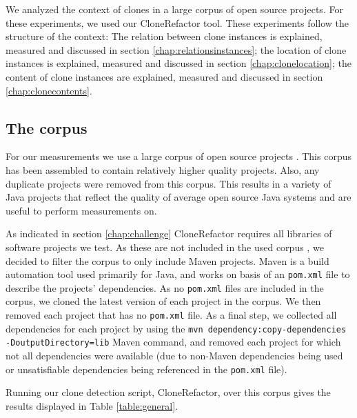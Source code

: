 \documentclass[a4paper]{article}
\begin{document}
We analyzed the context of clones in a large corpus of open source projects. For these experiments, we used our CloneRefactor tool. These experiments follow the structure of the context: The relation between clone instances is explained, measured and discussed in section \ref{chap:relationsinstances}; the location of clone instances is explained, measured and discussed in section \ref{chap:clonelocation};  the content of clone instances are explained, measured and discussed in section \ref{chap:clonecontents}.

\subsection{The corpus}\label{chap:corpus}
For our measurements we use a large corpus of open source projects \cite{githubCorpus2013}. This corpus has been assembled to contain relatively higher quality projects. Also, any duplicate projects were removed from this corpus. This results in a variety of Java projects that reflect the quality of average open source Java systems and are useful to perform measurements on.

As indicated in section \ref{chap:challenge} CloneRefactor requires all libraries of software projects we test. As these are not included in the used corpus \cite{githubCorpus2013}, we decided to filter the corpus to only include Maven projects. Maven is a build automation tool used primarily for Java, and works on basis of an \texttt{pom.xml} file to describe the projects' dependencies. As no \texttt{pom.xml} files are included in the corpus, we cloned the latest version of each project in the corpus. We then removed each project that has no \texttt{pom.xml} file. As a final step, we collected all dependencies for each project by using the \texttt{mvn dependency:copy-dependencies -DoutputDirectory=lib} Maven command, and removed each project for which not all dependencies were available (due to non-Maven dependencies being used or unsatisfiable dependencies being referenced in the \texttt{pom.xml} file).

Running our clone detection script, CloneRefactor, over this corpus gives the results displayed in Table \ref{table:general}.
\end{document}
